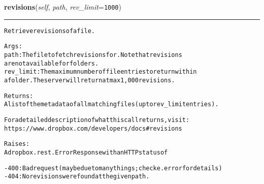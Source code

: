 \hspace{.8\funcindent}\begin{boxedminipage}{\funcwidth}

    \raggedright \textbf{revisions}(\textit{self}, \textit{path}, \textit{rev\_limit}={\tt 1000})

    \vspace{-1.5ex}

    \rule{\textwidth}{0.5\fboxrule}
\setlength{\parskip}{2ex}
\begin{alltt}
Retrieve revisions of a file.

Args:
    path: The file to fetch revisions for. Note that revisions
        are not available for folders.
    rev\_limit: The maximum number of file entries to return within
        a folder. The server will return at max 1,000 revisions.

Returns:
    A list of the metadata of all matching files (up to rev\_limit entries).

    For a detailed description of what this call returns, visit:
    https://www.dropbox.com/developers/docs\#revisions

Raises:
    A dropbox.rest.ErrorResponse with an HTTP status of

    - 400: Bad request (may be due to many things; check e.error for details)
    - 404: No revisions were found at the given path.
\end{alltt}

\setlength{\parskip}{1ex}
    \end{boxedminipage}

    \label{lib:dropbox:DropboxClient:restore}

    \vspace{0.5ex}

